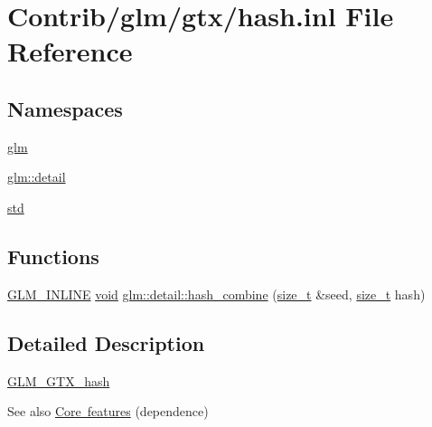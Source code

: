\hypertarget{hash_8inl}{}\section{Contrib/glm/gtx/hash.inl File Reference}
\label{hash_8inl}
\subsection*{Namespaces}
\begin{DoxyCompactItemize}
\item 
 \mbox{\hyperlink{namespaceglm}{glm}}
\item 
 \mbox{\hyperlink{namespaceglm_1_1detail}{glm\+::detail}}
\item 
 \mbox{\hyperlink{namespacestd}{std}}
\end{DoxyCompactItemize}
\subsection*{Functions}
\begin{DoxyCompactItemize}
\item 
\mbox{\hyperlink{setup_8hpp_a4603970cbd724c5d102bbcf17f430047}{G\+L\+M\+\_\+\+I\+N\+L\+I\+NE}} \mbox{\hyperlink{_s_d_l__opengles2__gl2ext_8h_ae5d8fa23ad07c48bb609509eae494c95}{void}} \mbox{\hyperlink{namespaceglm_1_1detail_a391b3eb8d7f4662a1b31046bd69f2755}{glm\+::detail\+::hash\+\_\+combine}} (\mbox{\hyperlink{_s_d_l__config_8h_a7c94ea6f8948649f8d181ae55911eeaf}{size\+\_\+t}} \&seed, \mbox{\hyperlink{_s_d_l__config_8h_a7c94ea6f8948649f8d181ae55911eeaf}{size\+\_\+t}} hash)
\end{DoxyCompactItemize}


\subsection{Detailed Description}
\mbox{\hyperlink{group__gtx__hash}{G\+L\+M\+\_\+\+G\+T\+X\+\_\+hash}}

\begin{DoxySeeAlso}{See also}
\mbox{\hyperlink{group__core}{Core features}} (dependence) 
\end{DoxySeeAlso}
